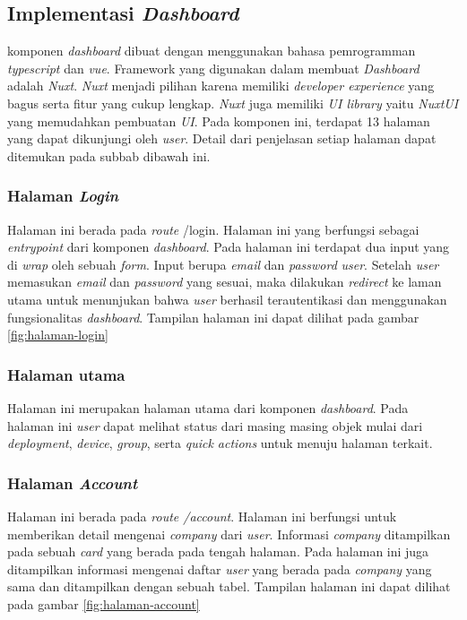 \subsection{Implementasi \textit{Dashboard}}
komponen \textit{dashboard} dibuat dengan menggunakan bahasa pemrogramman \textit{typescript} dan \textit{vue}. Framework yang digunakan dalam membuat \textit{Dashboard} adalah \textit{Nuxt}. \textit{Nuxt} menjadi pilihan karena memiliki \textit{developer experience} yang bagus serta fitur yang cukup lengkap. \textit{Nuxt} juga memiliki \textit{UI library} yaitu \textit{NuxtUI} yang memudahkan pembuatan \textit{UI}. Pada komponen ini, terdapat 13 halaman yang dapat dikunjungi oleh \textit{user}. Detail dari penjelasan setiap halaman dapat ditemukan pada subbab dibawah ini.

\subsubsection{Halaman \textit{Login}}
Halaman ini berada pada \textit{route} /login. Halaman ini yang berfungsi sebagai \textit{entrypoint} dari komponen \textit{dashboard}. Pada halaman ini terdapat dua input yang di \textit{wrap} oleh sebuah \textit{form}. Input berupa \textit{email} dan \textit{password} \textit{user}. Setelah \textit{user} memasukan \textit{email} dan \textit{password} yang sesuai, maka dilakukan \textit{redirect} ke laman utama untuk menunjukan bahwa \textit{user} berhasil terautentikasi dan menggunakan fungsionalitas \textit{dashboard}. Tampilan halaman ini dapat dilihat pada gambar \ref{fig:halaman-login}

\subsubsection{Halaman utama}
Halaman ini merupakan halaman utama dari komponen \textit{dashboard}. Pada halaman ini \textit{user} dapat melihat status dari masing masing objek mulai dari \textit{deployment}, \textit{device}, \textit{group}, serta \textit{quick actions} untuk menuju halaman terkait.

\subsubsection{Halaman \textit{Account}}
Halaman ini berada pada \textit{route /account}. Halaman ini berfungsi untuk memberikan detail mengenai \textit{company} dari \textit{user}. Informasi \textit{company} ditampilkan pada sebuah \textit{card} yang berada pada tengah halaman. Pada halaman ini juga ditampilkan informasi mengenai daftar \textit{user} yang berada pada \textit{company} yang sama dan ditampilkan dengan sebuah tabel. Tampilan halaman ini dapat dilihat pada gambar \ref{fig:halaman-account}

